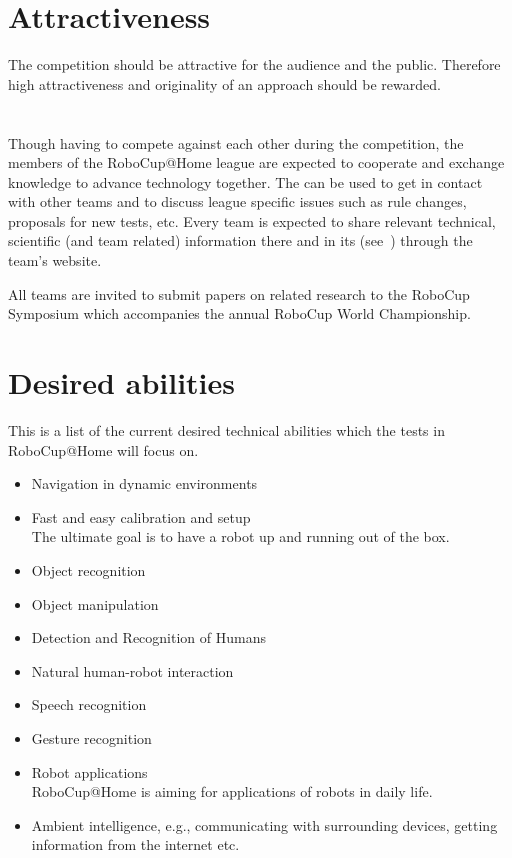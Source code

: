 \section{Attractiveness}
\label{concept:attractiveness}
The competition should be attractive for the audience and the public. Therefore high attractiveness and originality of an approach should be rewarded.

\section{}
\label{concept:community}
Though having to compete against each other during the competition, the members of the RoboCup@Home league are expected to cooperate and exchange knowledge to advance technology together. The  can be used to get in contact with other teams and to discuss league specific issues such as rule changes, proposals for new tests, etc.
Every team is expected to share relevant technical, scientific (and team related) information there and in its  (see~) through the team's website.

All teams are invited to submit papers on related research to the RoboCup Symposium which accompanies the annual RoboCup World Championship.

\section{Desired abilities}
\label{concept:desired_abilities}
This is a list of the current desired technical abilities which the tests in RoboCup@Home will focus on.

\begin{itemize}
\item Navigation in dynamic environments
\item Fast and easy calibration and setup \\ The ultimate goal is to have a robot up and running out of the box.
\item Object recognition
\item Object manipulation
\item Detection and Recognition of Humans
\item Natural human-robot interaction
\item Speech recognition
\item Gesture recognition
\item Robot applications \\ RoboCup@Home is aiming for applications of robots in daily life.
\item Ambient intelligence, e.g., communicating with surrounding devices, getting information from the internet etc.
\end{itemize}


